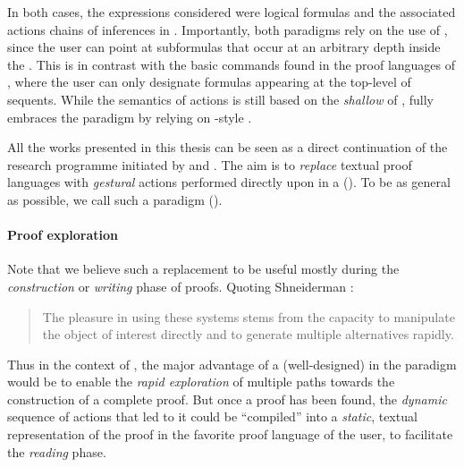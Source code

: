 In both cases, the expressions considered were logical formulas and the
associated actions chains of inferences in . Importantly, both paradigms rely
on the use of \emph{}, since the user can point at subformulas
that occur at an arbitrary depth inside the . This is in contrast with the
basic commands found in the proof languages of , where the user can only
designate formulas appearing at the top-level of sequents. While the
semantics of  actions is still based on the \emph{shallow}  of
,  fully embraces the  paradigm by relying on
-style .

\begin{emphpar}
  \AP All the works presented in this thesis can be seen as a direct
  continuation of the research programme initiated by  and . The
  aim is to \emph{replace} textual proof languages with \emph{gestural} actions
  performed directly upon \emph{} in a  (). To be as general as possible, we call such a
  paradigm  ().
\end{emphpar}

\paragraph{Proof exploration}

Note that we believe such a replacement to be useful mostly during the
\emph{construction} or \emph{writing} phase of proofs. Quoting Shneiderman
\cite{shneiderman_direct_1983}:
\begin{quote}
  The pleasure in using these systems stems from the capacity to manipulate the
object of interest directly and to generate multiple alternatives rapidly.
\end{quote}
Thus in the context of , the major advantage of a (well-designed)  in the
 paradigm would be to enable the \emph{rapid exploration} of multiple paths
towards the construction of a complete proof. But once a proof has been found,
the \emph{dynamic} sequence of actions that led to it could be ``compiled'' into
a \emph{static}, textual representation of the proof in the favorite proof
language of the user, to facilitate the \emph{reading} phase.

